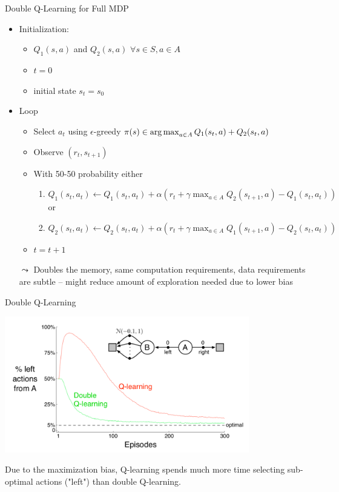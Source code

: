 \documentclass[aspectratio=169]{../latex_main/tntbeamer}  %
\begin{document}
\begin{frame}[c]{Double Q-Learning for Full MDP}	
	
	\begin{itemize}
		\item Initialization:
		\begin{itemize}
			\item $Q_1(s,a)$ and $Q_2(s,a)$ $\forall s \in S, a\in A$
			\item $t= 0$
			\item initial state $s_t = s_0$
		\end{itemize}
		\item Loop
		\begin{itemize}
			\item Select $a_t$ using $\epsilon$-greedy $\pi(s) \in \operatorname*{arg\,max}_{a \in A} Q_1(s_t, a) + Q_2(s_t , a)$
			\item Observe $(r_t, s_{t+1})$
			\item With 50-50 probability either
			\begin{enumerate}
				\item $Q_1(s_t, a_t) \gets Q_1(s_t, a_t) + \alpha (r_t +\gamma \max_{a\in A} Q_2(s_{t+1}, a) - Q_1(s_t, a_t))$\\
				or
				\item $Q_2(s_t, a_t) \gets Q_2(s_t, a_t) + \alpha (r_t +\gamma \max_{a\in A} Q_1(s_{t+1}, a) - Q_2(s_t, a_t))$
			\end{enumerate}
			\item $t = t + 1 $
		\end{itemize}
		\bigskip
		\pause
		\item[$\leadsto$] Doubles the memory, same computation requirements, data requirements are subtle -- might reduce amount of exploration needed due to lower bias
	\end{itemize}
	
	
\end{frame}
\begin{frame}[c]{Double Q-Learning~}
	
\begin{center}
\includegraphics[width=0.8\textwidth]{images/double_q.png}
\end{center}

Due to the maximization bias, Q-learning spends much more time
selecting sub-optimal actions ("left") than double Q-learning.
	
	
\end{frame}
\end{document}
